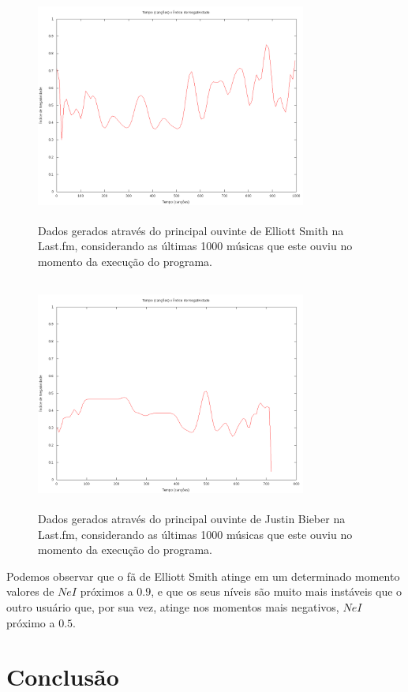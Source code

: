 \begin{figure}
\includegraphics[height=3in, width=3.5in]{theSimius_1000.png}
\caption{Dados gerados através do principal ouvinte de Elliott Smith na
 Last.fm, considerando as últimas 1000 músicas que este ouviu no momento da execução do programa.}
\label{fig:theSimius_1000}
\end{figure}

\begin{figure}
\includegraphics[height=3in, width=3.5in]{sam_alle_1000.png}
\caption{Dados gerados através do principal ouvinte de Justin Bieber na
 Last.fm, considerando as últimas 1000 músicas que este ouviu no momento da execução do programa.}
\label{fig:sam_alle_1000}
\end{figure}

Podemos observar que o fã de Elliott Smith atinge em um determinado
momento valores de $ NeI $ próximos a $ 0.9 $, e que os seus níveis
são muito mais instáveis que o outro usuário que, por sua vez, atinge
nos momentos mais negativos, $ NeI $ próximo a $ 0.5 $.

\section{Conclusão}

